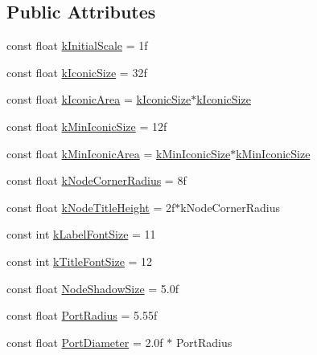 \subsection*{Public Attributes}
\begin{DoxyCompactItemize}
\item 
const float \hyperlink{classi_c_s___editor_config_a8ece9fb4625d0cacfbdb63d5f02f952b}{k\+Initial\+Scale} = 1f
\item 
const float \hyperlink{classi_c_s___editor_config_a325fb27e60c2efe07d04c4103510268c}{k\+Iconic\+Size} = 32f
\item 
const float \hyperlink{classi_c_s___editor_config_a9e36d360c442eaf24a66cf6473f11204}{k\+Iconic\+Area} = \hyperlink{classi_c_s___editor_config_a325fb27e60c2efe07d04c4103510268c}{k\+Iconic\+Size}$\ast$\hyperlink{classi_c_s___editor_config_a325fb27e60c2efe07d04c4103510268c}{k\+Iconic\+Size}
\item 
const float \hyperlink{classi_c_s___editor_config_a45c9251484ba31b906ec6d21a23b7150}{k\+Min\+Iconic\+Size} = 12f
\item 
const float \hyperlink{classi_c_s___editor_config_a5f508c4375e2836ce8aba4dd590599f6}{k\+Min\+Iconic\+Area} = \hyperlink{classi_c_s___editor_config_a45c9251484ba31b906ec6d21a23b7150}{k\+Min\+Iconic\+Size}$\ast$\hyperlink{classi_c_s___editor_config_a45c9251484ba31b906ec6d21a23b7150}{k\+Min\+Iconic\+Size}
\item 
const float \hyperlink{classi_c_s___editor_config_a477b2889d3d589f855216e31d69a8d9d}{k\+Node\+Corner\+Radius} = 8f
\item 
const float \hyperlink{classi_c_s___editor_config_a6e2c62f935932ead7d763aa19bb8ffa0}{k\+Node\+Title\+Height} = 2f$\ast$k\+Node\+Corner\+Radius
\item 
const int \hyperlink{classi_c_s___editor_config_a39c9fda912e4503a32baa835059e59ac}{k\+Label\+Font\+Size} = 11
\item 
const int \hyperlink{classi_c_s___editor_config_a25a0e526127b3055587db1fa518b6574}{k\+Title\+Font\+Size} = 12
\item 
const float \hyperlink{classi_c_s___editor_config_ad21bac32ea6da241cd281a99a4a90b2c}{Node\+Shadow\+Size} = 5.\+0f
\item 
const float \hyperlink{classi_c_s___editor_config_aec911aafdfcff1672a147c88454ad335}{Port\+Radius} = 5.\+55f
\item 
const float \hyperlink{classi_c_s___editor_config_ab189cc729baea3cf886be53355f172b1}{Port\+Diameter} = 2.\+0f $\ast$ Port\+Radius
\item 

\end{DoxyCompactItemize}
